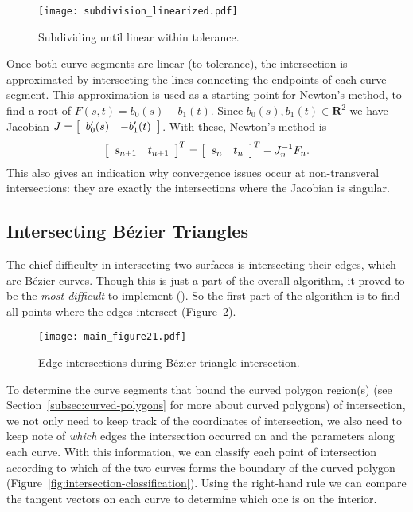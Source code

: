 \documentclass[letterpaper,10pt]{article}
\theoremstyle{definition}
\newcommand{\reals}{\mathbf{R}}
\begin{document}
\begin{figure}
  \texttt{[image: subdivision\_linearized.pdf]}
  \centering
  \captionsetup{width=.75\linewidth}
  \caption{Subdividing until linear within tolerance.}
  \label{fig:bezier-subdivision-linearized}
\end{figure}

Once both curve segments are linear (to tolerance), the intersection is
approximated by intersecting the lines connecting the endpoints of each
curve segment. This approximation is used as a starting point for Newton's
method, to find a root of \(F(s, t) = b_0(s) - b_1(t)\). Since
\(b_0(s), b_1(t) \in \reals^2\) we have Jacobian \(J =
\left[ \begin{array}{c c} b_0'(s) & -b_1'(t) \end{array}\right]\).
With these, Newton's method is
\begin{equation}
\left[ \begin{array}{c c} s_{n + 1} & t_{n + 1} \end{array}\right]^T =
\left[ \begin{array}{c c} s_n & t_n \end{array}\right]^T -
J_n^{-1} F_n.
\end{equation}
This also gives an indication why convergence issues occur at non-transveral
intersections: they are exactly the intersections where the Jacobian is
singular.

\subsection{Intersecting B\'{e}zier Triangles}\label{subsec:intersect-bez-tri}

The chief difficulty in intersecting two surfaces is intersecting their edges,
which are B\'{e}zier curves.
Though this is just a part of the overall algorithm, it proved to be the
\emph{most difficult} to implement (\cite{Hermes2017}). So the first part
of the algorithm is to find all points
where the edges intersect (Figure~\ref{fig:edge-intersections}).

\begin{figure}
  \texttt{[image: main\_figure21.pdf]}
  \centering
  \captionsetup{width=.75\linewidth}
  \caption{Edge intersections during B\'{e}zier triangle intersection.}
  \label{fig:edge-intersections}
\end{figure}

To determine the curve segments that bound the curved polygon region(s)
(see Section~\ref{subsec:curved-polygons} for more about curved polygons) of
intersection, we not only need to keep track
of the coordinates of intersection, we also need to keep note of
\emph{which} edges the intersection occurred on and the parameters along
each curve.
With this information, we can classify each point of intersection
according to which of the two curves forms the boundary of the
curved polygon (Figure~\ref{fig:intersection-classification}).
Using the right-hand rule we can compare the tangent
vectors on each curve to determine which one is on the interior.
\end{document}
